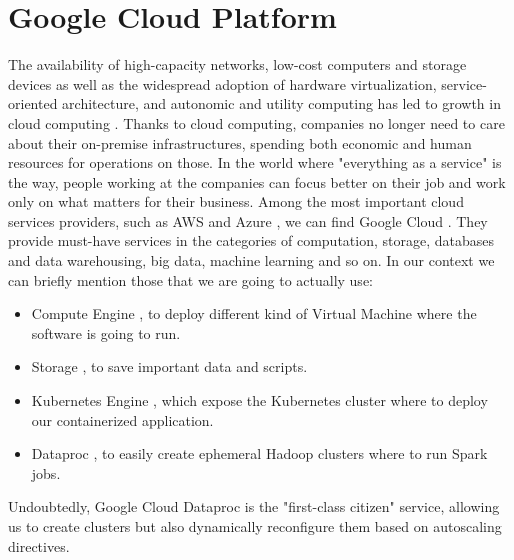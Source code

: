 \documentclass[12pt,twoside,cucitura]{toptesi}
\begin{document}
\section{Google Cloud Platform}
The availability of high-capacity networks, low-cost computers and storage devices as well as the widespread adoption of hardware virtualization, service-oriented architecture, and autonomic and utility computing has led to growth in cloud computing \cite{cloud}. Thanks to cloud computing, companies no longer need to care about their on-premise infrastructures, spending both economic and human resources for operations on those. In the world where "everything as a service" is the way, people working at the companies can focus better on their job and work only on what matters for their business.
Among the most important cloud services providers, such as AWS \cite{aws} and Azure \cite{azure}, we can find Google Cloud \cite{gcloud}. They provide must-have services in the categories of computation, storage, databases and data warehousing, big data, machine learning and so on. In our context we can briefly mention those that we are going to actually use:
\begin{itemize}
  \item Compute Engine \cite{gce}, to deploy different kind of Virtual Machine where the software is going to run.
  \item Storage \cite{gcs}, to save important data and scripts.
  \item Kubernetes Engine \cite{kube}\cite{gke}, which expose the Kubernetes cluster where to deploy our containerized application.
  \item Dataproc \cite{dataproc}, to easily create ephemeral Hadoop clusters where to run Spark jobs.
\end{itemize}

Undoubtedly, Google Cloud Dataproc is the "first-class citizen" service, allowing us to create clusters but also dynamically reconfigure them based on autoscaling directives.
\end{document}

